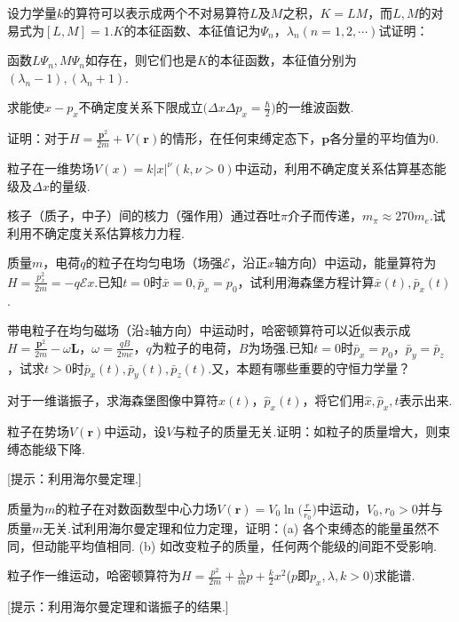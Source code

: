 \begin{exercises}
\exercise 设力学量$k$的算符可以表示成两个不对易算符$L$及$M$之积，$K=LM$，而$L,M$的对易式为$[L,M]=1$.$K$的本征函数、本征值记为$\varPsi_{n}$，$\lambda_{n}(n=1,2,\cdots)$试证明：

\noindent 函数$L\varPsi_{n},M\varPsi_{n}$如存在，则它们也是$K$的本征函数，本征值分别为$(\lambda_{n}-1),(\lambda_{n}+1)$.

\exercise 求能使$x-p_{x}$不确定度关系下限成立$\bigg(\Delta x\Delta p_{x}=\frac{\hbar}{2}\bigg)$的一维波函数.

\exercise 证明：对于$H=\frac{\boldsymbol{p}^{2}}{2m}+V(\boldsymbol{r})$的情形，在任何束缚定态下，$\boldsymbol{p}$各分量的平均值为0.

\exercise 粒子在一维势场$V(x)=k|x|^{\nu}(k,\nu>0)$中运动，利用不确定度关系估算基态能级及$\Delta x$的量级.

\exercise 核子（质子，中子）间的核力（强作用）通过吞吐$\pi$介子而传递，$m_{\pi}\approx 270m_{e}$.试利用不确定度关系估算核力力程.

\exercise 质量$m$，电荷$q$的粒子在均匀电场（场强$\mathscr{E}$，沿正$x$轴方向）中运动，能量算符为$H=\frac{p_{x}^{2}}{2m}=-q\mathscr{E}x$.已知$t=0$时$\bar{x}=0,\bar{p}_{x}=p_{0}$，试利用海森堡方程计算$\bar{x}(t),\bar{p}_{x}(t)$.

\exercise 带电粒子在均匀磁场（沿$z$轴方向）中运动时，哈密顿算符可以近似表示成$H=\frac{\boldsymbol{p}^{2}}{2m}-\omega\boldsymbol{L}$，$\omega=\frac{qB}{2mc}$，$q$为粒子的电荷，$B$为场强.已知$t=0$时$\bar{p}_{x}=p_{0}$，$\bar{p}_{y}=\bar{p}_{z}$，试求$t>0$时$\bar{p}_{x}(t),\bar{p}_{y}(t),\bar{p}_{z}(t)$.又，本题有哪些重要的守恒力学量？

\exercise 对于一维谐振子，求海森堡图像中算符$\hat{x}(t)$，$\hat{p}_{x}(t)$，将它们用$\hat{x},\hat{p}_{x},t$表示出来.

\exercise 粒子在势场$V(\boldsymbol{r})$中运动，设$V$与粒子的质量无关.证明：如粒子的质量增大，则束缚态能级下降.

[提示：利用海尔曼定理.]

\exercise 质量为$m$的粒子在对数函数型中心力场$V(\boldsymbol{r})=V_{0}\ln\bigg(\frac{r}{r_{0}})$中运动，$V_{0},r_{0}>0$并与质量$m$无关.试利用海尔曼定理和位力定理，证明：(a) 各个束缚态的能量虽然不同，但动能平均值相同. (b) 如改变粒子的质量，任何两个能级的间距不受影响.

\exercise 粒子作一维运动，哈密顿算符为$H=\frac{p^{2}}{2m}+\frac{\lambda}{m}p+\frac{k}{2}x^{2}$($p$即$p_{x},\lambda,k>0$)求能谱.

[提示：利用海尔曼定理和谐振子的结果.]



\end{exercises}

